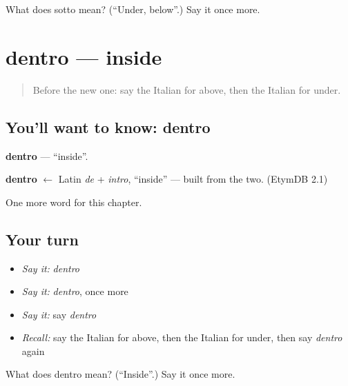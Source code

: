 \begin{tcolorbox}[breakable,colback=teal!4,colframe=teal!35!black,title={Before you move on}]
What does sotto mean? (\textquotedblleft{}Under, below\textquotedblright{}.) Say it once more.
\end{tcolorbox}
\section[dentro]{dentro — inside}

\label{lesson:IT-C80-dentro}



\begin{quote}
Before the new one: say the Italian for above, then the Italian for under.
\end{quote}

\subsection*{You'll want to know: dentro}
\textbf{dentro} — \textquotedblleft{}inside\textquotedblright{}.

\begin{cousinweb}
\textbf{dentro} $\leftarrow$ Latin \emph{de} + \emph{intro}, \textquotedblleft{}inside\textquotedblright{} — built from the two. (EtymDB 2.1)
\end{cousinweb}

\begin{grammarlens}[title={What you've built}]
One more word for this chapter.
\end{grammarlens}

\subsection*{Your turn}
\begin{itemize}
\raggedright
  \item \emph{Say it:} \emph{dentro}
  \item \emph{Say it:} \emph{dentro}, once more
  \item \emph{Say it:} say \emph{dentro}
  \item \emph{Recall:} say the Italian for above, then the Italian for under, then say \emph{dentro} again
\end{itemize}

\begin{tcolorbox}[breakable,colback=teal!4,colframe=teal!35!black,title={Before you move on}]
What does dentro mean? (\textquotedblleft{}Inside\textquotedblright{}.) Say it once more.
\end{tcolorbox}
